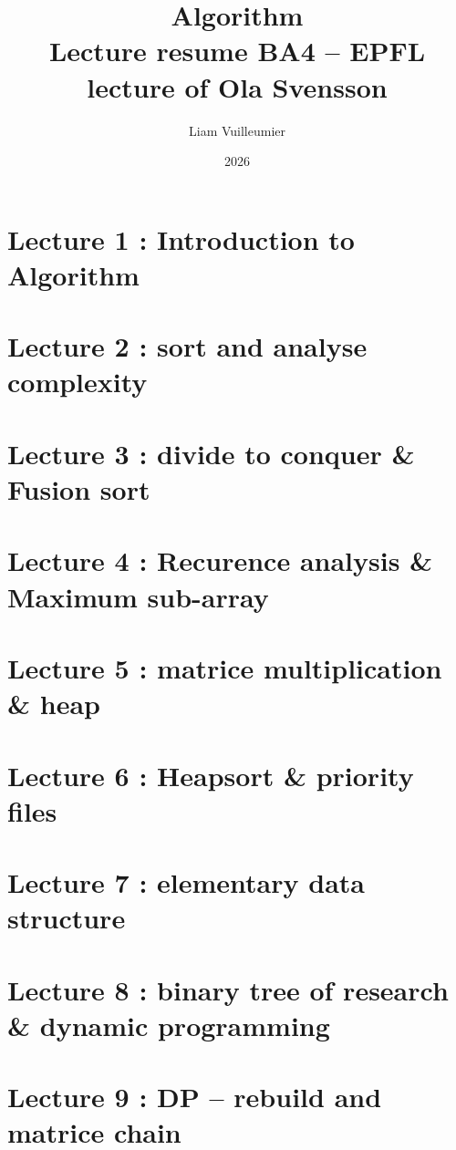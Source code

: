 \documentclass[a4paper,11pt]{article}
\title{\textbf{Algorithm}\\[0.5em]
       \large Lecture resume BA4 -- EPFL\\
       lecture of Ola Svensson}
\author{Liam Vuilleumier}
\date{2026}
\begin{document}
\maketitle
\tableofcontents
\newpage

\section{Lecture 1 : Introduction to Algorithm}


\section{Lecture 2 : sort and analyse complexity}


\section{Lecture 3 : divide to conquer \& Fusion sort}


\section{Lecture 4 : Recurence analysis \& Maximum sub-array}


\section{Lecture 5 : matrice multiplication \& heap}


\section{Lecture 6 : Heapsort \& priority files}


\section{Lecture 7 : elementary data structure }


\section{Lecture 8 : binary tree of research \& dynamic programming}


\section{Lecture 9 : DP – rebuild and matrice chain}

\end{document}
